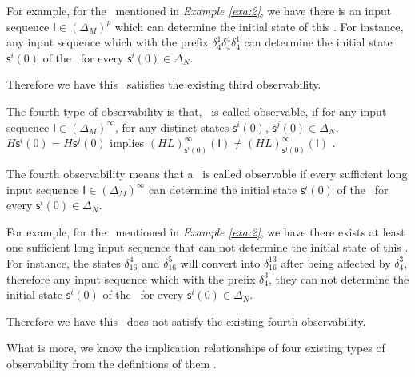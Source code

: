 \begin{example}
For example, for the \BCN\ mentioned in {\em Example \ref{exa:2}}, we have there is an input sequence $\mathsf{I}\in(\Delta_M)^p$ which can determine the initial state of this \BCN. For instance, any input sequence which with the prefix $\delta_{4}^1\delta_{4}^4\delta_{4}^1$ can determine the initial state $\mathsf{s}^{i}(0)$ of the \BCN\ for every $\mathsf{s}^{i}(0)\in\Delta_N$.

Therefore we have this \BCN\ satisfies the existing third observability.
\end{example}  
\begin{definition}
	The fourth type of observability is that, \BCN\ is called observable, if for any input sequence $\mathsf{I}\in(\Delta_M)^{\infty}$, for any distinct states $\mathsf{s}^{i}(0)$, $\mathsf{s}^{j}(0) \in \Delta_N$, $H\mathsf{s}^{i}(0)=H\mathsf{s}^{j}(0)$ implies $(HL)^{\infty}_{\mathsf{s}^{i}(0)}(\mathsf{I})\neq (HL)^{\infty}_{\mathsf{s}^{j}(0)}(\mathsf{I})$ \cite{Fornasini2013Observability}.
\end{definition}

The fourth observability means that a \BCN\ is called observable if every sufficient long input sequence $\mathsf{I}\in(\Delta_M)^{\infty}$ can determine the initial state $\mathsf{s}^{i}(0)$ of the \BCN\ for every $\mathsf{s}^{i}(0)\in\Delta_N$.
\begin{example}
For example, for the \BCN\ mentioned in {\em Example \ref{exa:2}}, we have there exists at least one sufficient long input sequence that can not determine the initial state of this \BCN. For instance, the states $\delta_{16}^4$ and $\delta_{16}^5$  will convert into $\delta_{16}^{13}$ after being affected by $\delta_{4}^3$, therefore any input sequence which with the prefix $\delta_{4}^3$, they can not determine the initial state $\mathsf{s}^{i}(0)$ of the \BCN\ for every $\mathsf{s}^{i}(0)\in\Delta_N$.

Therefore we have this \BCN\ does not satisfy the existing fourth observability.
\end{example}  

What is more, we know the implication relationships of four existing types of observability from the definitions of them \cite{Zhang2016Observability}. 

